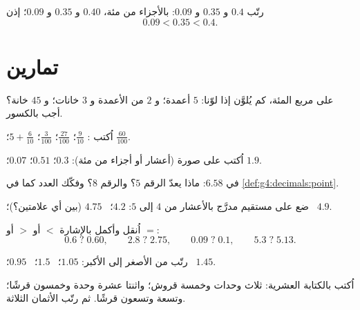 \begin{example}\label{ex:g4:decimals:compare}
رتّب $0.4$ و $0.35$ و $0.09$: بالأجزاء من مئة، $0.40$ و $0.35$
و $0.09$؛ إذن
\[
0.09 < 0.35 < 0.4 .
\]
\end{example}

\section{تمارين}

\begin{exercise}[$\star$]\label{exo:g4:decimals:1}
على مربع المئة، كم يُلوَّن إذا لوّنا: $5$ أعمدة؛
و $2$ من الأعمدة و $3$ خانات؛ و $45$ خانة؟ أجب بالكسور.
\end{exercise}

\begin{exercise}[$\star$]\label{exo:g4:decimals:2}
اُكتب :
$\frac{9}{10}$؛ \quad $\frac{27}{100}$؛ \quad $\frac{3}{100}$؛ \quad
$5 + \frac{6}{10}$؛ \quad $\frac{60}{100}$.
\end{exercise}

\begin{exercise}[$\star$]\label{exo:g4:decimals:3}
اُكتب على صورة  (أعشار أو أجزاء من مئة):
$0.3$؛ \quad $0.51$؛ \quad $0.07$؛ \quad $1.9$.
\end{exercise}

\begin{exercise}[$\star$]\label{exo:g4:decimals:4}
في $6.58$: ماذا يعدّ الرقم $5$؟ والرقم $8$؟ وفكّك
العدد كما في \cref{def:g4:decimals:point}.
\end{exercise}

\begin{exercise}[$\star$]\label{exo:g4:decimals:5}
ضع على مستقيم مدرَّج بالأعشار من $4$ إلى $5$:
$4.2$؛ \ $4.75$ (بين أي علامتين؟)؛ \ $4.9$.
\end{exercise}

\begin{exercise}[$\star$]\label{exo:g4:decimals:6}
اُنقل وأكمل بالإشارة $<$ أو $>$ أو $=$:
\[
0.6 \;?\; 0.60, \qquad
2.8 \;?\; 2.75, \qquad
0.09 \;?\; 0.1, \qquad
5.3 \;?\; 5.13 .
\]
\end{exercise}

\begin{exercise}[$\star$]\label{exo:g4:decimals:7}
رتّب من الأصغر إلى الأكبر: $1.05$؛ \ $1.5$؛ \ $0.95$؛ \ $1.45$.
\end{exercise}

\begin{exercise}[$\star$]\label{exo:g4:decimals:8}
اُكتب بالكتابة العشرية: ثلاث وحدات وخمسة قروش؛ واثنتا عشرة
وحدة وخمسون قرشًا؛ وتسعة وتسعون قرشًا. ثم رتّب الأثمان الثلاثة.
\end{exercise}

